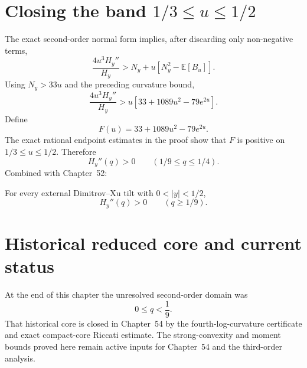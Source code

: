\section{Closing the band $1/3\le u\le1/2$}
The exact second-order normal form implies, after discarding only non-negative terms,
\[
\frac{4u^3H_y''}{H_y}>N_y+u\left[N_y^2-\mathbb E[B_u]\right].
\]
Using $N_y>33u$ and the preceding curvature bound,
\[
\frac{4u^3H_y''}{H_y}>u\left[33+1089u^2-79e^{2u}\right].
\]
Define
\[
F(u)=33+1089u^2-79e^{2u}.
\]
The exact rational endpoint estimates in the proof show that $F$ is positive on $1/3\le u\le1/2$. Therefore
\[
\boxed{H_y''(q)>0\qquad(1/9\le q\le1/4).}
\]
Combined with Chapter~52:

\begin{theorem}
For every external Dimitrov--Xu tilt with $0<|y|<1/2$,
\[
\boxed{H_y''(q)>0\qquad(q\ge1/9).}
\]
\end{theorem}

\section{Historical reduced core and current status}
At the end of this chapter the unresolved second-order domain was
\[
\boxed{0\le q<\frac19}.
\]
That historical core is closed in Chapter~54 by the fourth-log-curvature certificate and exact compact-core Riccati estimate. The strong-convexity and moment bounds proved here remain active inputs for Chapter~54 and the third-order analysis.

